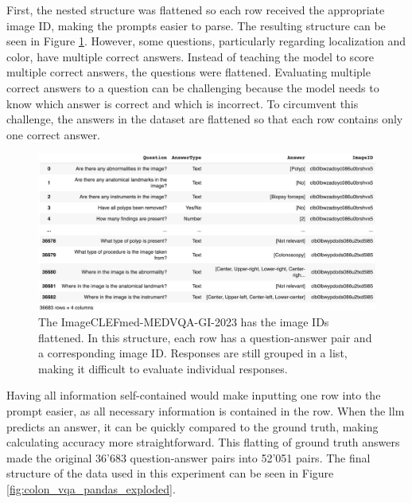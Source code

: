         First, the nested structure was flattened so each row received the appropriate image ID, making the prompts easier to parse. The resulting structure can be seen in Figure \ref{fig:colon_vqa_pandas}. However, some questions, particularly regarding localization and color, have multiple correct answers. Instead of teaching the model to score multiple correct answers, the questions were flattened. Evaluating multiple correct answers to a question can be challenging because the model needs to know which answer is correct and which is incorrect. To circumvent this challenge, the answers in the dataset are flattened so that each row contains only one correct answer.

        \begin{figure}[htb]
            \centering
            \centerline{
            \includegraphics[width=1.2\textwidth]{images/colon_vqa_pandas.png}}
            \caption{The ImageCLEFmed-MEDVQA-GI-2023 has the image IDs flattened. In this structure, each row has a question-answer pair and a corresponding image ID. Responses are still grouped in a list, making it difficult to evaluate individual responses.}
            \label{fig:colon_vqa_pandas}
        \end{figure}

        Having all information self-contained would make inputting one row into the prompt easier, as all necessary information is contained in the row. 
        When the \gls{llm} predicts an answer, it can be quickly compared to the ground truth, making calculating accuracy more straightforward.
        This flatting of ground truth answers made the original 36'683 question-answer pairs into 52'051 pairs.
        The final structure of the data used in this experiment can be seen in Figure \ref{fig:colon_vqa_pandas_exploded}.


